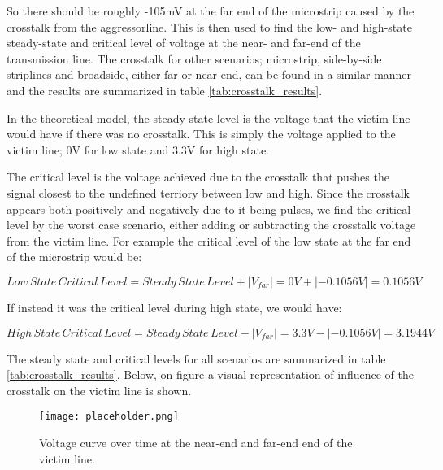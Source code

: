 \documentclass[../main.tex]{subfiles}
\begin{document}
So there should be roughly -105mV at the far end of the microstrip caused by the crosstalk from the aggressorline. This is then used to find the low- and high-state steady-state and critical level of voltage at the near- and far-end of the transmission line. The crosstalk for other scenarios; microstrip, side-by-side striplines and broadside, either far or near-end, can be found in a similar manner and the results are summarized in table \ref{tab:crosstalk_results}. 


In the theoretical model, the steady state level is the voltage that the victim line would have if there was no crosstalk. This is simply the voltage applied to the victim line; 0V for low state and 3.3V for high state.


The critical level is the voltage achieved due to the crosstalk that pushes the signal closest to the undefined terriory between low and high. Since the crosstalk appears both positively and negatively due to it being pulses, we find the critical level by the worst case scenario, either adding or subtracting the crosstalk voltage from the victim line. For example the critical level of the low state at the far end of the microstrip would be:

\begin{equation}
    Low\,State\,Critical\,Level = Steady\,State\,Level + |V_{far}| = 0 V + |-0.1056 V| = 0.1056 V
\end{equation}

If instead it was the critical level during high state, we would have:

\begin{equation}
    High\,State\,Critical\,Level = Steady\,State\,Level - |V_{far}| = 3.3 V - |-0.1056 V| = 3.1944 V
\end{equation}

The steady state and critical levels for all scenarios are summarized in table \ref{tab:crosstalk_results}. Below, on figure  a visual representation of influence of the crosstalk on the victim line is shown.

\begin{figure}[H]
    \centering
    \texttt{[image: placeholder.png]}
    \caption{Voltage curve over time at the near-end and far-end end of the victim line.}
    \label{fig:microstrip_voltage_curve}
\end{figure}
\end{document}
